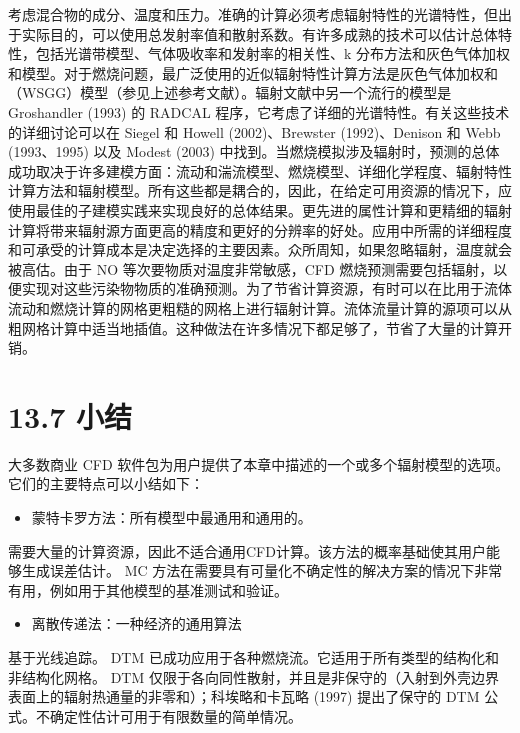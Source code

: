 \documentclass[11pt,a4paper,openany,fontset=none]{ctexbook}
\begin{document}
考虑混合物的成分、温度和压力。准确的计算必须考虑辐射特性的光谱特性，但出于实际目的，可以使用总发射率值和散射系数。有许多成熟的技术可以估计总体特性，包括光谱带模型、气体吸收率和发射率的相关性、k 分布方法和灰色气体加权和模型。对于燃烧问题，最广泛使用的近似辐射特性计算方法是灰色气体加权和（WSGG）模型（参见上述参考文献）。辐射文献中另一个流行的模型是 Groshandler (1993) 的 RADCAL 程序，它考虑了详细的光谱特性。有关这些技术的详细讨论可以在 Siegel 和 Howell (2002)、Brewster (1992)、Denison 和 Webb (1993、1995) 以及 Modest (2003) 中找到。当燃烧模拟涉及辐射时，预测的总体成功取决于许多建模方面：流动和湍流模型、燃烧模型、详细化学程度、辐射特性计算方法和辐射模型。所有这些都是耦合的，因此，在给定可用资源的情况下，应使用最佳的子建模实践来实现良好的总体结果。更先进的属性计算和更精细的辐射计算将带来辐射源方面更高的精度和更好的分辨率的好处。应用中所需的详细程度和可承受的计算成本是决定选择的主要因素。众所周知，如果忽略辐射，温度就会被高估。由于 NO 等次要物质对温度非常敏感，CFD 燃烧预测需要包括辐射，以便实现对这些污染物物质的准确预测。为了节省计算资源，有时可以在比用于流体流动和燃烧计算的网格更粗糙的网格上进行辐射计算。流体流量计算的源项可以从粗网格计算中适当地插值。这种做法在许多情况下都足够了，节省了大量的计算开销。

\section*{13.7 小结}

大多数商业 CFD 软件包为用户提供了本章中描述的一个或多个辐射模型的选项。它们的主要特点可以小结如下：

\begin{itemize}

\item 蒙特卡罗方法：所有模型中最通用和通用的。

\end{itemize}

需要大量的计算资源，因此不适合通用CFD计算。该方法的概率基础使其用户能够生成误差估计。 MC 方法在需要具有可量化不确定性的解决方案的情况下非常有用，例如用于其他模型的基准测试和验证。

\begin{itemize}

\item 离散传递法：一种经济的通用算法

\end{itemize}

基于光线追踪。 DTM 已成功应用于各种燃烧流。它适用于所有类型的结构化和非结构化网格。 DTM 仅限于各向同性散射，并且是非保守的（入射到外壳边界表面上的辐射热通量的非零和）；科埃略和卡瓦略
(1997) 提出了保守的 DTM 公式。不确定性估计可用于有限数量的简单情况。
\end{document}
